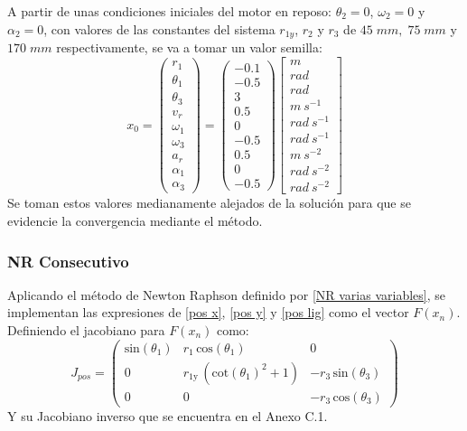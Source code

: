\documentclass[12pt]{article}
\begin{document}
A partir de unas condiciones iniciales del motor en reposo: $\theta_2=0$, $\omega_2=0$ y $\alpha_2=0$, con valores de las constantes del sistema $r_{1y}$, $r_2$ y $r_3$ de $45\;mm,\;75\;mm$ y $170\;mm$ respectivamente, se va a tomar un valor semilla:
\footnotesize
\begin{equation}
    x_0=\begin{pmatrix}
r_1\\ 
\theta_1\\ 
\theta_3\\ 
v_r\\ 
\omega_1\\ 
\omega_3\\ 
a_r\\ 
\alpha_1\\ 
\alpha_3
\end{pmatrix}=\begin{pmatrix}
-0.1\\ 
-0.5\\ 
3\\ 
0.5\\ 
0\\ 
-0.5\\ 
0.5\\ 
0\\ 
-0.5
\end{pmatrix} \begin{bmatrix}
m\\ 
rad\\ 
rad\\ 
m\ s^{-1}\\ 
rad\ s^{-1}\\ 
rad\ s^{-1}\\ 
m\ s^{-2}\\ 
rad\ s^{-2}\\ 
rad\ s^{-2}
\end{bmatrix}
\end{equation}
\normalsize
Se toman estos valores medianamente alejados de la solución para que se evidencie la convergencia mediante el método.
\subsubsection{NR Consecutivo}\label{SecNRC}
Aplicando el método de Newton Raphson definido por \eqref{NR varias variables}, se implementan las expresiones de \eqref{pos x}, \eqref{pos y} y \eqref{pos lig} como el vector $F(x_n)$. Definiendo el jacobiano para $F(x_n)$ como:
\footnotesize
\begin{equation}
    J_{pos}=\left(\begin{array}{ccc}
\mathrm{sin}\left(\theta_1 \right) & r_1 \,\mathrm{cos}\left(\theta_1 \right) & 0\\
0 & r_{\textrm{1y}} \,{\left({\mathrm{cot}\left(\theta_1 \right)}^2 +1\right)} & -r_3 \,\mathrm{sin}\left(\theta_3 \right)\\
0 & 0 & -r_3 \,\mathrm{cos}\left(\theta_3 \right)
\end{array}\right)
\label{jacobiano pos}
\end{equation}
\normalsize
Y su Jacobiano inverso que se encuentra en el Anexo C.1.
\end{document}
